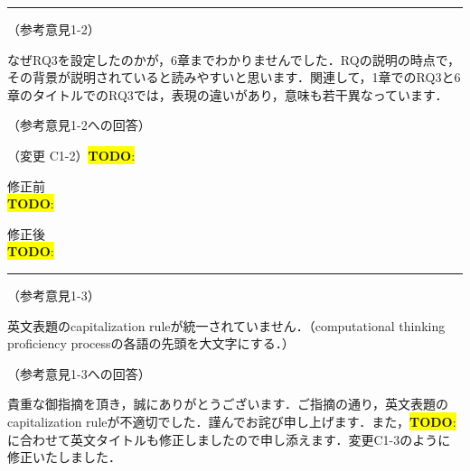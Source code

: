 \documentclass{jarticle} %
\newcommand{\todo}[1]{\colorbox{yellow}{{\bf TODO}:}{\color{blue}{\textbf{[#1]}}}}
\def\subsection#1{ \vspace{1pc} {\gt #1} }
\def\nextans{ \vspace{2pc} \hrule }
\begin{document}
\newpage
\nextans
\subsection{（参考意見1-2）}

なぜRQ3を設定したのかが，6章までわかりませんでした．RQの説明の時点で，その背景が説明されていると読みやすいと思います．関連して，1章でのRQ3と6章のタイトルでのRQ3では，表現の違いがあり，意味も若干異なっています．

\subsection{（参考意見1-2への回答）}



\subsection{（変更 C1-2）\todo{hoge}}
\vspace{-0.3cm}
\begin{description}
\item 修正前\\
\phantom{　}
\todo{hoge}
\vspace{-0.3cm}
\item 修正後\\
\phantom{　}
\todo{hoge}
\end{description}

\newpage
\nextans
\subsection{（参考意見1-3）}

英文表題のcapitalization ruleが統一されていません．（computational thinking proficiency processの各語の先頭を大文字にする．）

\subsection{（参考意見1-3への回答）}

貴重な御指摘を頂き，誠にありがとうございます．ご指摘の通り，英文表題のcapitalization ruleが不適切でした．謹んでお詫び申し上げます．また，\todo{変更XX}に合わせて英文タイトルも修正しましたので申し添えます．変更C1-3のように修正いたしました．
\end{document}
